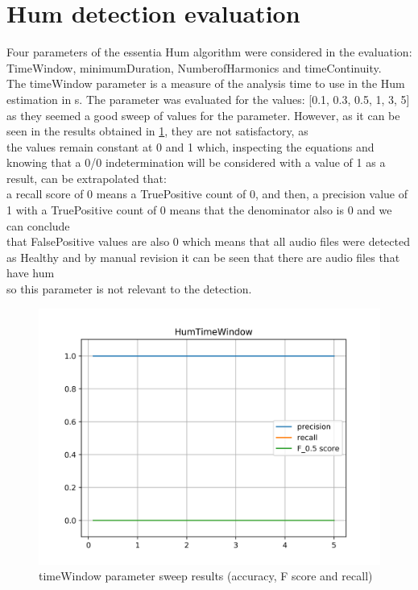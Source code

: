 \section{Hum detection evaluation}
Four parameters of the essentia Hum algorithm were considered in the evaluation: TimeWindow, minimumDuration, NumberofHarmonics and timeContinuity. \\
The timeWindow parameter is a measure of the analysis time to use in the Hum estimation in s. The parameter was evaluated for the values: [0.1, 0.3, 0.5, 1, 3, 5] \\
as they seemed a good sweep of values for the parameter. However, as it can be seen in the results obtained in \ref{fig:humTimeWindow}, they are not satisfactory, as \\
the values remain constant at 0 and 1 which, inspecting the equations and knowing that a 0/0 indetermination will be considered with a value of 1 as a result, can be extrapolated that: \\
a recall score of 0 means a TruePositive count of 0, and then, a precision value of 1 with a TruePositive count of 0 means that the denominator also is 0 and we can conclude \\
that FalsePositive values are also 0 which means that all audio files were detected as Healthy and by manual revision it can be seen that there are audio files that have hum \\
so this parameter is not relevant to the detection.

\begin{figure}[!ht]
	\includegraphics[clip,width=\columnwidth]{Figures/HumTimeWindow.png}%
	\caption{timeWindow parameter sweep results (accuracy, F score and recall)}
	\label{fig:humTimeWindow}
\end{figure}

